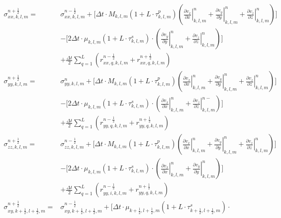 \documentclass[pdftex,a4paper,parskip,listof=totoc,bibliography=totoc,onehalfspacing,12pt]{scrreprt}
\begin{document}
\begin{align*}
	\sigma_{xx,k,l,m}^{n+\frac{1}{2}} =&\sigma_{xx,k,l,m}^{n-\frac{1}{2}}+ \Bigg[ \Delta t \cdot M_{k,l,m} \left(1+L\cdot \tau^p_{k,l,m}\right)\left( \left.\frac{\partial v_x}{\partial x}\right\rvert_{k,l,m}^{n} + \left.\frac{\partial v_y}{\partial y}\right\rvert_{k,l,m}^{n} + \left.\frac{\partial v_z}{\partial z}\right\rvert_{k,l,m}^{n} \right)\Bigg]  \\
	&- \Bigg[ 2 \Delta t \cdot \mu_{k,l,m} \left(1+L\cdot \tau^s_{k,l,m}\right)\cdot \left( \left.\frac{\partial v_y}{\partial y}\right\rvert_{k,l,m}^{n} + \left.\frac{\partial v_z}{\partial z}\right\rvert_{k,l,m}^{n} \right)\Bigg] \\
	&+ \frac{\Delta t}{2} \sum _{q=1}^{L} \left( r_{xx,q,k,l,m}^{n-\frac{1}{2}}+ r_{xx,q,k,l,m}^{n+\frac{1}{2}}\right) \\
	\sigma_{yy,k,l,m}^{n+\frac{1}{2}} =&\sigma_{yy,k,l,m}^{n}+ \Bigg[ \Delta t \cdot M_{k,l,m} \left(1+L\cdot \tau^p_{k,l,m}\right)\left( \left.\frac{\partial v_x}{\partial x}\right\rvert_{k,l,m}^{n} + \left.\frac{\partial v_y}{\partial y}\right\rvert_{k,l,m}^{n} + \left.\frac{\partial v_z}{\partial z}\right\rvert_{k,l,m}^{n} \right)\Bigg]  \\
	&- \Bigg[ 2 \Delta t \cdot \mu_{k,l,m} \left(1+L\cdot \tau^s_{k,l,m}\right)\cdot \left( \left.\frac{\partial v_x}{\partial x}\right\rvert_{k,l,m}^{n} + \left.\frac{\partial v_z}{\partial z}\right\rvert_{k,l,m}^{n-} \right)\Bigg] \\
	&+ \frac{\Delta t}{2} \sum _{q=1}^{L} \left( r_{yy,q,k,l,m}^{n-\frac{1}{2}}+ r_{yy,q,k,l,m}^{n+\frac{1}{2}}\right)\\ 
	\sigma_{zz,k,l,m}^{n+\frac{1}{2}} =&\sigma_{zz,k,l,m}^{n-\frac{1}{2}}+ \Bigg[ \Delta t \cdot M_{k,l,m} \left(1+L\cdot \tau^p_{k,l,m}\right)\left( \left.\frac{\partial v_x}{\partial x}\right\rvert_{k,l,m}^{n}+ \left.\frac{\partial v_y}{\partial y}\right\rvert_{k,l,m}^{n} + \left.\frac{\partial v_z}{\partial z}\right\rvert_{k,l,m}^{n} \right)\Bigg]  \\
	&- \Bigg[ 2 \Delta t \cdot \mu_{k,l,m} \left(1+L\cdot \tau^s_{k,l,m}\right)\cdot \left( \left.\frac{\partial v_x}{\partial x}\right\rvert_{k,l,m}^{n} + \left.\frac{\partial v_y}{\partial y}\right\rvert_{k,l,m}^{n} \right)\Bigg] \\
	&+ \frac{\Delta t}{2} \sum _{q=1}^{L} \left( r_{yy,i,k,l,m}^{n-\frac{1}{2}}+ r_{yy,q,k,l,m}^{n+\frac{1}{2}}\right)\\ 
	\sigma_{xy,k+\frac{1}{2},l+\frac{1}{2},m}^{n+\frac{1}{2}} =&\sigma_{xy,k+\frac{1}{2},l+\frac{1}{2},m}^{n-\frac{1}{2}}+\Bigg[\Delta t \cdot \mu_{k+\frac{1}{2},l+\frac{1}{2},m}\left(1+L\cdot\tau_{k+\frac{1}{2},l+\frac{1}{2},m}^s \right)\cdot \\ 

\end{align*}
\end{document}
